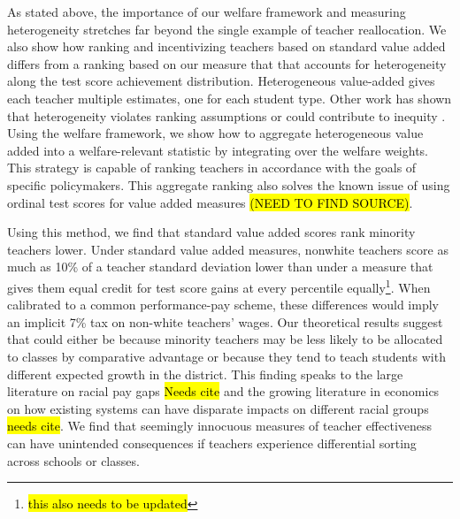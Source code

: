 \documentclass[12pt]{article}
\theoremstyle{definition}
\theoremstyle{definition}
\theoremstyle{definition}
\theoremstyle{definition}
\begin{document}

    As stated above, the importance of our welfare framework and measuring heterogeneity stretches far beyond the single example of teacher reallocation. We also show how ranking and incentivizing teachers based on standard value added differs from a ranking based on our measure that that accounts for heterogeneity along the test score achievement distribution. Heterogeneous value-added gives each teacher multiple estimates, one for each student type. Other work has shown that heterogeneity violates ranking assumptions \citep{condie2014teacher} or could contribute to inequity \citep{Delgado2020,bates2022teacher}. Using the welfare framework, we show how to aggregate heterogeneous value added into a welfare-relevant statistic by integrating over the welfare weights. This strategy is capable of ranking teachers in accordance with the goals of specific policymakers. This aggregate ranking also solves the known issue of using ordinal test scores for value added measures \hl{(NEED TO FIND SOURCE)}. 
    
    Using this method, we find that standard value added scores rank minority teachers lower. Under standard value added measures, nonwhite teachers score as much as 10\% of a teacher standard deviation lower than under a measure that gives them equal credit for test score gains at every percentile equally\footnote{\hl{this also needs to be updated}}. When calibrated to a common performance-pay scheme, these differences would imply an implicit 7\% tax on non-white teachers' wages. Our theoretical results suggest that could either be because minority teachers may be less likely to be allocated to classes by comparative advantage or because they tend to teach students with different expected growth in the district. This finding  speaks to the large literature on racial pay gaps \hl{Needs cite} and the growing literature in economics on how existing systems can have disparate impacts on different racial groups \hl{needs cite}. We find that seemingly innocuous measures of teacher effectiveness can have unintended consequences if teachers experience differential sorting across schools or classes.
    
\end{document}
